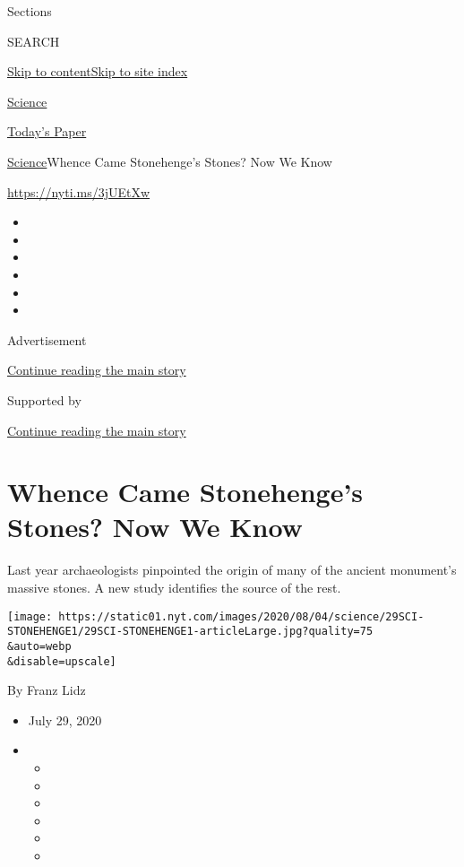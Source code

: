Sections

SEARCH

\protect\hyperlink{site-content}{Skip to
content}\protect\hyperlink{site-index}{Skip to site index}

\href{https://www.nytimes.com/section/science}{Science}

\href{https://myaccount.nytimes.com/auth/login?response_type=cookie\&client_id=vi}{}

\href{https://www.nytimes.com/section/todayspaper}{Today's Paper}

\href{/section/science}{Science}\textbar{}Whence Came Stonehenge's
Stones? Now We Know

\url{https://nyti.ms/3jUEtXw}

\begin{itemize}
\item
\item
\item
\item
\item
\item
\end{itemize}

Advertisement

\protect\hyperlink{after-top}{Continue reading the main story}

Supported by

\protect\hyperlink{after-sponsor}{Continue reading the main story}

\hypertarget{whence-came-stonehenges-stones-now-we-know}{%
\section{Whence Came Stonehenge's Stones? Now We
Know}\label{whence-came-stonehenges-stones-now-we-know}}

Last year archaeologists pinpointed the origin of many of the ancient
monument's massive stones. A new study identifies the source of the
rest.

\texttt{[image: https://static01.nyt.com/images/2020/08/04/science/29SCI-STONEHENGE1/29SCI-STONEHENGE1-articleLarge.jpg?quality=75\\\&auto=webp\\\&disable=upscale]}

By Franz Lidz

\begin{itemize}
\item
  July 29, 2020
\item
  \begin{itemize}
  \item
  \item
  \item
  \item
  \item
  \item
  \end{itemize}
\end{itemize}

